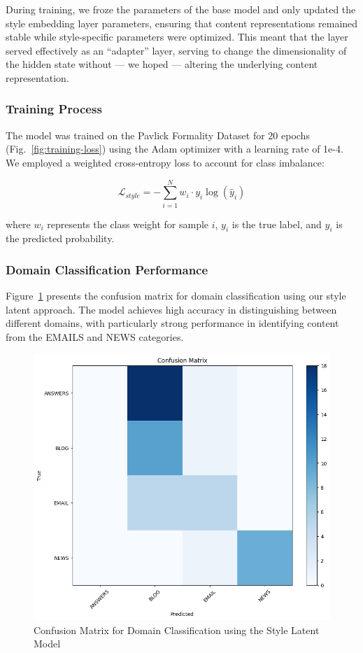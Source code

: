 \documentclass[twocolumn]{article}
\begin{document}
During training, we froze the parameters of the base model and only updated the style embedding layer parameters, ensuring that content representations remained stable while style-specific parameters were optimized.
This meant that the layer served effectively as an ``adapter'' layer, serving to change the dimensionality of the hidden state without --- we hoped --- altering the underlying content representation.

\subsubsection{Training Process}
The model was trained on the Pavlick Formality Dataset for 20 epochs (Fig.~\ref{fig:training-loss}) using the Adam optimizer with a learning rate of 1e-4.
We employed a weighted cross-entropy loss to account for class imbalance:

\begin{equation}
\mathcal{L}_{style} = -\sum_{i=1}^{N} w_i \cdot y_i \log(\hat{y}_i)
\end{equation}

where $w_i$ represents the class weight for sample $i$, $y_i$ is the true label, and $\hat{y}_i$ is the predicted probability.

\subsubsection{Domain Classification Performance}
Figure~\ref{fig:domain-confusion} presents the confusion matrix for domain classification using our style latent approach. The model achieves high accuracy in distinguishing between different domains, with particularly strong performance in identifying content from the EMAILS and NEWS categories.

\begin{figure}
    \centering
    \includegraphics[width=0.9\linewidth]{figures/4_confusion.png}
    \caption{Confusion Matrix for Domain Classification using the Style Latent Model}
    \label{fig:domain-confusion}
\end{figure}
\end{document}
